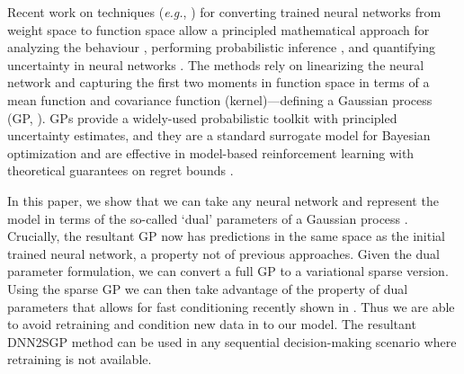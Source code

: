 \documentclass{article}
\makeatletter
\newcommand{\eg}{\textit{e.g.\@}\xspace}
\makeatother
\begin{document}
Recent work on techniques (\eg, \cite{list}) for converting trained neural networks from weight space to function space allow a principled mathematical approach for analyzing the behaviour \cite{add}, performing probabilistic inference \cite{add}, and quantifying uncertainty in neural networks \cite{add}. The methods rely on linearizing the neural network and capturing the first two moments in function space in terms of a mean function and covariance function (kernel)---defining a Gaussian process (GP, \cite{rasmussen2006gaussian}). GPs provide a widely-used probabilistic toolkit with principled uncertainty estimates, and they are a standard surrogate model for Bayesian optimization \citep{garnett_bayesoptbook_2022} and are effective in model-based reinforcement learning \citep{deisenroth2011pilco} with theoretical guarantees on regret bounds \citep{srinivas2009gaussian}. 

In this paper, we show that we can take any neural network and represent the model in terms of the so-called `dual' parameters of a Gaussian process \cite{csato2002sparse, adam2021dual, chang2020fast}. Crucially, the resultant GP now has predictions in the same space as the initial trained neural network, a property not of previous approaches. Given the dual parameter formulation, we can convert a full GP to a variational sparse version. Using the sparse GP we can then take advantage of the property of dual parameters that allows for fast conditioning recently shown in \cite{chang2022fantasizing}. Thus we are able to avoid retraining and condition new data in to our model. The resultant DNN2SGP method can be used in any sequential decision-making scenario where retraining is not available.%
\end{document}
